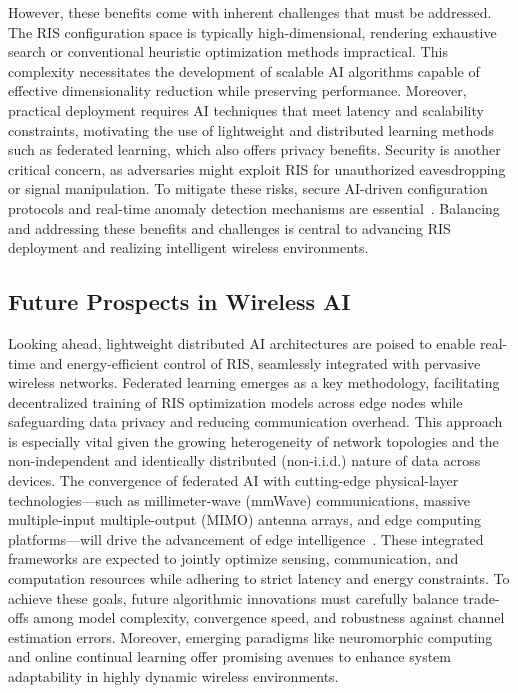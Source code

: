 \documentclass[sigconf]{acmart}
\begin{document}
However, these benefits come with inherent challenges that must be addressed. The RIS configuration space is typically high-dimensional, rendering exhaustive search or conventional heuristic optimization methods impractical. This complexity necessitates the development of scalable AI algorithms capable of effective dimensionality reduction while preserving performance. Moreover, practical deployment requires AI techniques that meet latency and scalability constraints, motivating the use of lightweight and distributed learning methods such as federated learning, which also offers privacy benefits. Security is another critical concern, as adversaries might exploit RIS for unauthorized eavesdropping or signal manipulation. To mitigate these risks, secure AI-driven configuration protocols and real-time anomaly detection mechanisms are essential~\cite{ref49}. Balancing and addressing these benefits and challenges is central to advancing RIS deployment and realizing intelligent wireless environments.

\subsection{Future Prospects in Wireless AI}

Looking ahead, lightweight distributed AI architectures are poised to enable real-time and energy-efficient control of RIS, seamlessly integrated with pervasive wireless networks. Federated learning emerges as a key methodology, facilitating decentralized training of RIS optimization models across edge nodes while safeguarding data privacy and reducing communication overhead. This approach is especially vital given the growing heterogeneity of network topologies and the non-independent and identically distributed (non-i.i.d.) nature of data across devices. The convergence of federated AI with cutting-edge physical-layer technologies—such as millimeter-wave (mmWave) communications, massive multiple-input multiple-output (MIMO) antenna arrays, and edge computing platforms—will drive the advancement of edge intelligence~\cite{ref49}. These integrated frameworks are expected to jointly optimize sensing, communication, and computation resources while adhering to strict latency and energy constraints. To achieve these goals, future algorithmic innovations must carefully balance trade-offs among model complexity, convergence speed, and robustness against channel estimation errors. Moreover, emerging paradigms like neuromorphic computing and online continual learning offer promising avenues to enhance system adaptability in highly dynamic wireless environments.
\end{document}
